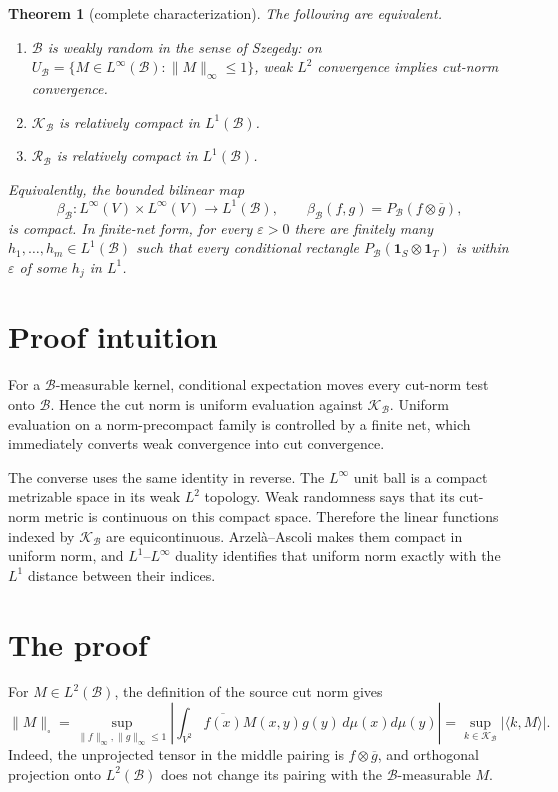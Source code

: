 \documentclass[11pt]{article}
\newtheorem{theorem}{Theorem}
\newcommand{\one}{\mathbf 1}
\newcommand{\cB}{\mathcal B}
\newcommand{\cK}{\mathcal K}
\newcommand{\cR}{\mathcal R}
\begin{document}
\begin{theorem}[complete characterization]\label{thm:main}
The following are equivalent.
\begin{enumerate}[label=\textup{(\roman*)}]
\item $\cB$ is weakly random in the sense of Szegedy: on
  $U_{\cB}=\{M\in L^\infty(\cB):\|M\|_\infty\leq1\}$, weak $L^2$
  convergence implies cut-norm convergence.
\item $\cK_{\cB}$ is relatively compact in $L^1(\cB)$.
\item $\cR_{\cB}$ is relatively compact in $L^1(\cB)$.
\end{enumerate}
Equivalently, the bounded bilinear map
\[
 \beta_{\cB}:L^\infty(V)\times L^\infty(V)\longrightarrow L^1(\cB),
 \qquad \beta_{\cB}(f,g)=P_{\cB}(f\otimes\overline g),
\]
is compact.  In finite-net form, for every $\varepsilon>0$ there are finitely
many $h_1,\dots,h_m\in L^1(\cB)$ such that every conditional rectangle
$P_{\cB}(\one_S\otimes\one_T)$ is within $\varepsilon$ of some $h_j$ in
$L^1$.
\end{theorem}

\section{Proof intuition}

For a $\cB$-measurable kernel, conditional expectation moves every cut-norm
test onto $\cB$.  Hence the cut norm is uniform evaluation against
$\cK_{\cB}$.  Uniform evaluation on a norm-precompact family is controlled by
a finite net, which immediately converts weak convergence into cut
convergence.

The converse uses the same identity in reverse.  The $L^\infty$ unit ball is
a compact metrizable space in its weak $L^2$ topology.  Weak randomness says
that its cut-norm metric is continuous on this compact space.  Therefore the
linear functions indexed by $\cK_{\cB}$ are equicontinuous.  Arzel\`a--Ascoli
makes them compact in uniform norm, and $L^1$--$L^\infty$ duality identifies
that uniform norm exactly with the $L^1$ distance between their indices.

\section{The proof}

For $M\in L^2(\cB)$, the definition of the source cut norm gives
\begin{equation}\label{eq:cutrepresentation}
 \|M\|_\square
 =\sup_{\|f\|_\infty,\|g\|_\infty\leq1}
   \left|\int_{V^2}\overline{f(x)}M(x,y)g(y)\,d\mu(x)d\mu(y)\right|
 =\sup_{k\in\cK_{\cB}}|\langle k,M\rangle|.
\end{equation}
Indeed, the unprojected tensor in the middle pairing is
$f\otimes\overline g$, and orthogonal projection onto $L^2(\cB)$ does not
change its pairing with the $\cB$-measurable $M$.
\end{document}
